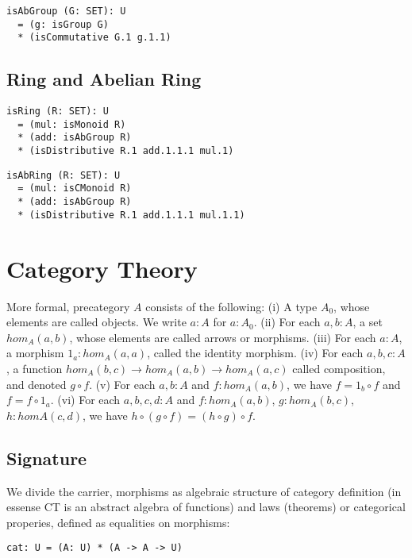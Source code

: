 \documentclass{article}
\begin{document}
\begin{lstlisting}[mathescape=true]
isAbGroup (G: SET): U
  = (g: isGroup G)
  * (isCommutative G.1 g.1.1)
\end{lstlisting}

\subsection{Ring and Abelian Ring}

\begin{lstlisting}[mathescape=true]
isRing (R: SET): U
  = (mul: isMonoid R)
  * (add: isAbGroup R)
  * (isDistributive R.1 add.1.1.1 mul.1)
\end{lstlisting}

\begin{lstlisting}[mathescape=true]
isAbRing (R: SET): U
  = (mul: isCMonoid R)
  * (add: isAbGroup R)
  * (isDistributive R.1 add.1.1.1 mul.1.1)
\end{lstlisting}

\newpage
\section{Category Theory}

More formal, precategory $A$ consists of the following:
(i)   A type $A_0$, whose elements are called objects. We write $a: A$ for $a: A_0$.
(ii)  For each $a,b: A$, a set $hom_A(a,b)$, whose elements are called arrows or morphisms.
(iii) For each $a: A$, a morphism $1_a : hom_A(a,a)$, called the identity morphism.
(iv)  For each $a,b,c: A$, a function $hom_A(b,c) \rightarrow hom_A(a,b) \rightarrow hom_A(a,c)$
      called composition, and denoted $g \circ f$.
(v)   For each $a,b: A$ and $f: hom_A(a,b)$, we have $f = 1_b \circ f$ and $f = f \circ 1_a$.
(vi)  For each $a,b,c,d: A$ and $f: hom_A(a,b)$, $g: hom_A(b,c)$, $h: homA(c,d)$,
      we have $h \circ (g \circ f ) = (h \circ g) \circ f$.

\subsection{Signature}

We divide the carrier, morphisms as algebraic structure of category
definition (in essense CT is an abstract algebra of functions) and laws (theorems)
or categorical properies, defined as equalities on morphisms:

\begin{lstlisting}[mathescape=true]
cat: U = (A: U) * (A -> A -> U)
\end{lstlisting}
\end{document}
